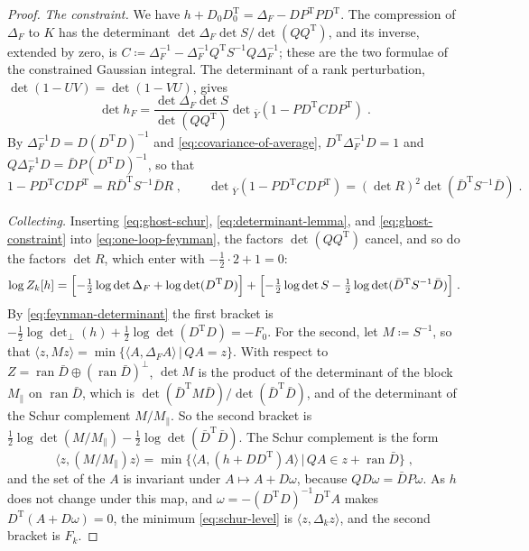 \documentclass[11pt]{preprint}
\numberwithin{equation}{section}
\theoremstyle{definition}
\theoremstyle{remark}
\theoremstyle{plain}
\begin{document}
\begin{proof}
\emph{The constraint.} We have $h + D_0D_0^{\mathrm T} = \Delta_F - DP^{\mathrm T}PD^{\mathrm T}$. The compression of $\Delta_F$ to $K$ has the determinant $\det\Delta_F\det S/\det(QQ^{\mathrm T})$, and its inverse, extended by zero, is $C \coloneqq \Delta_F^{-1} - \Delta_F^{-1}Q^{\mathrm T}S^{-1}Q\Delta_F^{-1}$; these are the two formulae of the constrained Gaussian integral. The determinant of a rank perturbation, $\det(1 - UV) = \det(1 - VU)$, gives
\begin{equation}\label{eq:determinant-lemma}
    \det h_F = \frac{\det\Delta_F\det S}{\det(QQ^{\mathrm T})}\det{}_{\bar Y}(1 - PD^{\mathrm T}CDP^{\mathrm T})\;.
\end{equation}
By $\Delta_F^{-1}D = D(D^{\mathrm T}D)^{-1}$ and \eqref{eq:covariance-of-average}, $D^{\mathrm T}\Delta_F^{-1}D = 1$ and $Q\Delta_F^{-1}D = \bar DP(D^{\mathrm T}D)^{-1}$, so that
\begin{equation}\label{eq:ghost-constraint}
    1 - PD^{\mathrm T}CDP^{\mathrm T} = R\bar D^{\mathrm T}S^{-1}\bar DR\;,
    \qquad
    \det{}_{\bar Y}(1 - PD^{\mathrm T}CDP^{\mathrm T}) = (\det R)^2\det(\bar D^{\mathrm T}S^{-1}\bar D)\;.
\end{equation}

\emph{Collecting.} Inserting \eqref{eq:ghost-schur}, \eqref{eq:determinant-lemma}, and \eqref{eq:ghost-constraint} into \eqref{eq:one-loop-feynman}, the factors $\det(QQ^{\mathrm T})$ cancel, and so do the factors $\det R$, which enter with $-\frac12 \cdot 2 + 1 = 0$:
\begin{equation}\label{eq:two-brackets}
    \log Z_k[h] = \Bigl[-\tfrac12\log\det\Delta_F + \log\det(D^{\mathrm T}D)\Bigr] + \Bigl[-\tfrac12\log\det S - \tfrac12\log\det(\bar D^{\mathrm T}S^{-1}\bar D)\Bigr]\;.
\end{equation}
By \eqref{eq:feynman-determinant} the first bracket is $-\frac12\log\det_\perp(h) + \frac12\log\det(D^{\mathrm T}D) = -F_0$. For the second, let $M \coloneqq S^{-1}$, so that $\langle z, Mz \rangle = \min\{ \langle A, \Delta_FA \rangle \, | \, QA = z \}$. With respect to $Z = \operatorname{ran}\bar D \oplus (\operatorname{ran}\bar D)^\perp$, $\det M$ is the product of the determinant of the block $M_\parallel$ on $\operatorname{ran}\bar D$, which is $\det(\bar D^{\mathrm T}M\bar D)/\det(\bar D^{\mathrm T}\bar D)$, and of the determinant of the Schur complement $M/M_\parallel$. So the second bracket is $\frac12\log\det(M/M_\parallel) - \frac12\log\det(\bar D^{\mathrm T}\bar D)$. The Schur complement is the form
\begin{equation}\label{eq:schur-level}
    \langle z, (M/M_\parallel)z \rangle = \min\bigl\{ \langle A, (h + DD^{\mathrm T})A \rangle \, \big| \, QA \in z + \operatorname{ran}\bar D \bigr\}\;,
\end{equation}
and the set of the $A$ is invariant under $A \mapsto A + D\omega$, because $QD\omega = \bar DP\omega$. As $h$ does not change under this map, and $\omega = -(D^{\mathrm T}D)^{-1}D^{\mathrm T}A$ makes $D^{\mathrm T}(A + D\omega) = 0$, the minimum \eqref{eq:schur-level} is $\langle z, \Delta_kz \rangle$, and the second bracket is $F_k$.
\end{proof}
\end{document}
